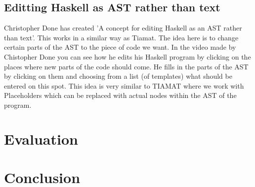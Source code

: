 \documentclass[a4paper,12pt]{report}
\begin{document}
\section{Editting Haskell as AST rather than text}
Christopher Done has created 'A concept for editing Haskell as an AST rather than text'. This works in a similar way as Tiamat. The idea here is to change certain parts of the AST to the piece of 
code we want. In the video made by Chistopher Done you can see how he edits his Haskell program by clicking on the places where new parts of the code should come. He fills in the parts of the AST
by clicking on them and choosing from a list (of templates) what should be entered on this spot.
This idea is very similar to TIAMAT where we work with Placeholders which can be replaced with actual nodes within the AST of the program.
\chapter{Evaluation}
\chapter{Conclusion}
\end{document}
